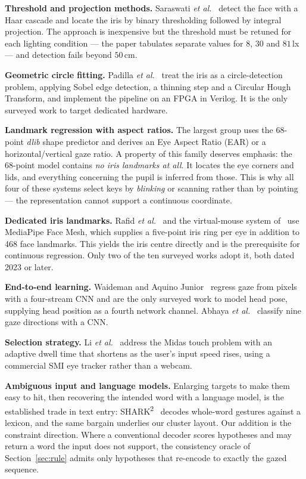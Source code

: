 \documentclass[conference]{IEEEtran}
\begin{document}
\textbf{Threshold and projection methods.} Saraswati \emph{et al.}~\cite{ref08}
detect the face with a Haar cascade and locate the iris by binary thresholding
followed by integral projection. The approach is inexpensive but the threshold
must be retuned for each lighting condition --- the paper tabulates separate
values for $8$, $30$ and $81$\,lx --- and detection fails beyond $50$\,cm.

\textbf{Geometric circle fitting.} Padilla \emph{et al.}~\cite{ref09} treat the
iris as a circle-detection problem, applying Sobel edge detection, a thinning
step and a Circular Hough Transform, and implement the pipeline on an FPGA in
Verilog. It is the only surveyed work to target dedicated hardware.

\textbf{Landmark regression with aspect ratios.} The largest group
\cite{ref02,ref03,ref05,ref07} uses the 68-point \emph{dlib} shape predictor and
derives an Eye Aspect Ratio (EAR) or a horizontal/vertical gaze ratio. A
property of this family deserves emphasis: the 68-point model contains
\emph{no iris landmarks at all}. It locates the eye corners and lids, and
everything concerning the pupil is inferred from those. This is why all four of
these systems select keys by \emph{blinking} or scanning rather than by
pointing --- the representation cannot support a continuous coordinate.

\textbf{Dedicated iris landmarks.} Rafid \emph{et al.}~\cite{ref04} and the
virtual-mouse system of~\cite{ref06} use MediaPipe Face Mesh, which supplies a
five-point iris ring per eye in addition to 468 face landmarks. This yields the
iris centre directly and is the prerequisite for continuous regression. Only two
of the ten surveyed works adopt it, both dated 2023 or later.

\textbf{End-to-end learning.} Waideman and Aquino Junior~\cite{ref01} regress
gaze from pixels with a four-stream CNN and are the only surveyed work to model
head pose, supplying head position as a fourth network channel. Abhaya
\emph{et al.}~\cite{ref03} classify nine gaze directions with a CNN.

\textbf{Selection strategy.} Li \emph{et al.}~\cite{ref09b} address the Midas
touch problem with an adaptive dwell time that shortens as the user's input
speed rises, using a commercial SMI eye tracker rather than a webcam.

\textbf{Ambiguous input and language models.} Enlarging targets to make them
easy to hit, then recovering the intended word with a language model, is the
established trade in text entry: SHARK\textsuperscript{2}~\cite{ref17} decodes
whole-word gestures against a lexicon, and the same bargain underlies our
cluster layout. Our addition is the constraint direction. Where a conventional
decoder scores hypotheses and may return a word the input does not support, the
consistency oracle of Section~\ref{sec:rule} admits only hypotheses that
re-encode to exactly the gazed sequence.
\end{document}
